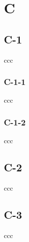\chapter{C}

\section{C-1}
ccc

\subsection{C-1-1}
ccc

\subsection{C-1-2}
ccc

\section{C-2}
ccc

\section{C-3}
ccc